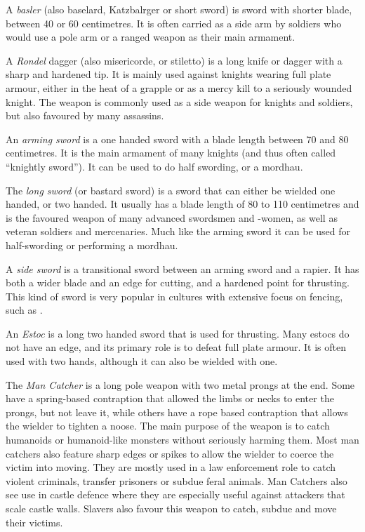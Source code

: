 A \emph{basler} (also baselard, Katzbalrger or short sword) is sword with
shorter blade, between 40 or 60 centimetres. It is often carried as a side arm
by soldiers who would use a pole arm or a ranged weapon as their main
armament.

A \emph{Rondel} dagger (also misericorde, or stiletto) is a long knife or
dagger with a sharp and hardened tip. It is mainly used against knights wearing
full plate armour, either in the heat of a grapple or as a mercy kill to a
seriously wounded knight. The weapon is commonly used as a side weapon for
knights and soldiers, but also favoured by many assassins.

An \emph{arming sword} is a one handed sword with a blade length between 70
and 80 centimetres. It is the main armament of many knights (and thus often
called ``knightly sword''). It can be used to do half swording, or a mordhau.

The \emph{long sword} (or bastard sword) is a sword that can either be wielded
one handed, or two handed. It usually has a blade length of 80 to 110
centimetres and is the favoured weapon of many advanced swordsmen and -women,
as well as veteran soldiers and mercenaries. Much like the arming sword it
can be used for half-swording or performing a mordhau.

A \emph{side sword} is a transitional sword between an arming sword and a
rapier. It has both a wider blade and an edge for cutting, and a hardened
point for thrusting. This kind of sword is very popular in cultures with
extensive focus on fencing, such as .

An \emph{Estoc} is a long two handed sword that is used for thrusting. Many
estocs do not have an edge, and its primary role is to defeat full plate
armour. It is often used with two hands, although it can also be wielded with
one.

The \emph{Man Catcher} is a long pole weapon with two metal prongs at the end.
Some have a spring-based contraption that allowed the limbs or necks to enter
the prongs, but not leave it, while others have a rope based contraption that
allows the wielder to tighten a noose. The main purpose of the weapon is to
catch humanoids or humanoid-like monsters without seriously harming them. Most
man catchers also feature sharp edges or spikes to allow the wielder to coerce
the victim into moving. They are mostly used in a law enforcement role to
catch violent criminals, transfer prisoners or subdue feral animals. Man
Catchers also see use in castle defence where they are especially useful
against attackers that scale castle walls. Slavers also favour this weapon to
catch, subdue and move their victims.


